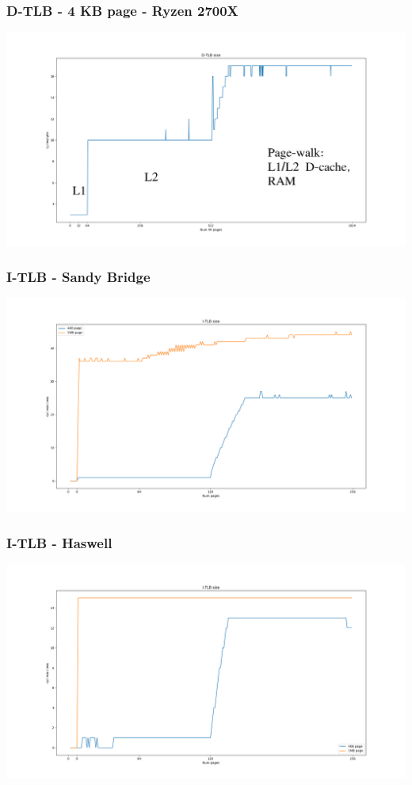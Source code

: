 \documentclass{beamer}
\begin{document}
\begin{frame}
\frametitle{D-TLB - 4 KB page - Ryzen 2700X}
\includegraphics[scale=.18]{img/dtlb_size_zen.png}
\end{frame}

\begin{frame}
\frametitle{I-TLB - Sandy Bridge}
\includegraphics[scale=.26]{img/itlb_size_sandybridge.png}
\end{frame}

\begin{frame}
\frametitle{I-TLB - Haswell}
\includegraphics[scale=.26]{img/itlb_size_haswell.png}
\end{frame}
\end{document}
